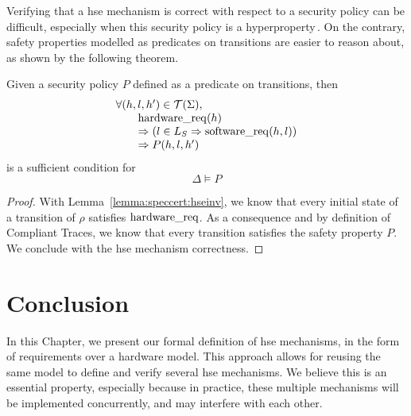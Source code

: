 Verifying that a \ac{hse} mechanism is correct with respect to a security policy
can be difficult, especially when this security policy is a
hyperproperty\,\cite{clarkson2010hyperproperties}.
%
On the contrary, safety properties modelled as predicates on transitions are
easier to reason about, as shown by the following theorem.

\begin{theorem}
  \label{theorem:speccert:correcthse}
  Given a security policy $P$ defined as a predicate on transitions, then
  \[
    \begin{array}{l}
      \forall (h, l, h') \in \mathcal{T}(\Sigma), \\
      \qquad \mathrm{hardware\_req}(h) \\
      \qquad \Rightarrow (l \in L_{S} \Rightarrow \mathrm{software\_req}(h, l))\\
      \qquad \Rightarrow P(h, l, h')
    \end{array}
  \]
  is a sufficient condition for
  \[
    \Delta \models P
  \]

  \begin{proof}
    With Lemma~\ref{lemma:speccert:hseinv}, we know that every initial state of
    a transition of $\rho$ satisfies $\mathrm{hardware\_req}$.
    As a consequence and by definition of Compliant Traces, we know that every
    transition satisfies the safety property $P$.
    We conclude with the \ac{hse} mechanism correctness.
  \end{proof}
\end{theorem}

\section{Conclusion}

In this Chapter, we present our formal definition of \ac{hse} mechanisms, in the
form of requirements over a hardware model.
%
This approach allows for reusing the same model to define and verify several
\ac{hse} mechanisms.
%
We believe this is an essential property, especially because in practice, these
multiple mechanisms will be implemented concurrently, and may interfere with
each other.

